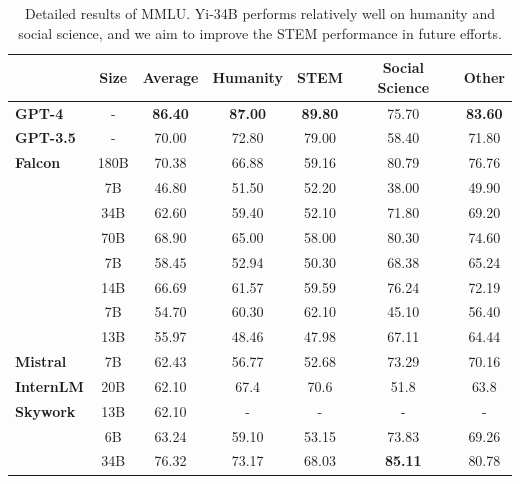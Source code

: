 \begin{table}[t!]
  \centering
  \begin{tabular}{@{}lcccccc@{}}
\toprule
           &   \bf Size   & \bf Average  & \bf Humanity & \bf STEM  & \bf Social Science & \bf Other \\
\midrule
\bf GPT-4 & - & \textbf{86.40}   & \textbf{87.00} & \textbf{89.80}    & 75.70 & \textbf{83.60}    \\
\bf GPT-3.5 & - & 70.00 & 72.80 & 79.00    & 58.40 & 71.80   \\
\gmidrule
\bf Falcon  & 180B      & 70.38 & 66.88    & 59.16 & 80.79          & 76.76 \\
\gmidrule
\multirow{3}{*}{\bf  L\textsmaller{LaMA} 2} 
& 7B & 46.80 & 51.50 & 52.20 & 38.00 & 49.90 \\
& 34B & 62.60 & 59.40 & 52.10 & 71.80 & 69.20 \\
& 70B & 68.90 & 65.00 & 58.00 & 80.30 & 74.60 \\
\gmidrule
\multirow{2}{*}{\bf Qwen}
 & 7B & 58.45 & 52.94    & 50.30 & 68.38         & 65.24 \\ 
 & 14B     & 66.69 & 61.57   & 59.59 & 76.24         & 72.19 \\
 \gmidrule
\multirow{2}{*}{\bf Baichuan 2} 
 &  7B & 54.70 & 60.30 & 62.10 & 45.10 & 56.40 \\
 & 13B     & 55.97 & 48.46    & 47.98 & 67.11          & 64.44 \\
 \gmidrule
\bf Mistral & 7B & 62.43 & 56.77 & 52.68 & 73.29 & 70.16 \\
\gmidrule
\bf InternLM & 20B & 62.10 & 67.4 & 70.6 & 51.8 & 63.8 \\
\gmidrule
\bf Skywork & 13B & 62.10 &  -    & -      & -      & - \\
\gmidrule
\multirow{2}{*}{\bf Yi} & 6B          & 63.24 & 59.10    & 53.15 & 73.83          & 69.26 \\
& 34B    & 76.32 & 73.17   & 68.03 & \textbf{85.11}          & 80.78 \\
\bottomrule

  \end{tabular}
   \caption{Detailed results of MMLU. 
   Yi-34B performs relatively well on humanity and social science, and we aim to improve the STEM performance  in future efforts. 
   }
  \label{tab:mmlu_table}
\end{table}
